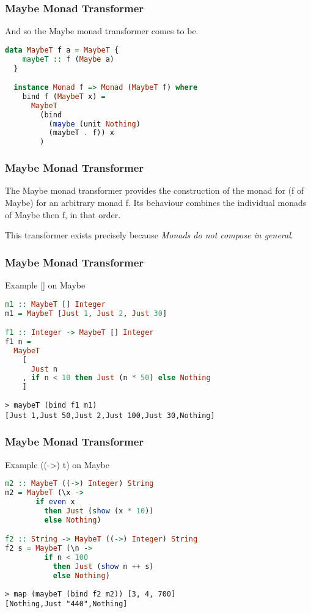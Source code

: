 \begin{frame}[fragile]
\frametitle{Maybe Monad Transformer}
And so the Maybe monad transformer comes to be.

\begin{lstlisting}[language=haskell]
  data MaybeT f a = MaybeT { 
    maybeT :: f (Maybe a)
  }

  instance Monad f => Monad (MaybeT f) where
    bind f (MaybeT x) =
      MaybeT 
        (bind 
          (maybe (unit Nothing) 
          (maybeT . f)) x
        )
\end{lstlisting}
\end{frame}

\begin{frame}[fragile]
\frametitle{Maybe Monad Transformer}
\begin{block}{The Maybe monad transformer}
provides the construction of the monad for (f of Maybe) for an arbitrary monad f. Its behaviour combines the individual monads of Maybe then f, in that order.
\end{block}
\begin{block}{This transformer exists}
precisely because \emph{Monads do not compose in general}.
\end{block}
\end{frame}

\begin{frame}[fragile]
\frametitle{Maybe Monad Transformer}
\begin{block}{Example [] on Maybe}
\begin{lstlisting}[language=haskell]
m1 :: MaybeT [] Integer
m1 = MaybeT [Just 1, Just 2, Just 30]

f1 :: Integer -> MaybeT [] Integer
f1 n =
  MaybeT
    [
      Just n
    , if n < 10 then Just (n * 50) else Nothing
    ]
\end{lstlisting}
\end{block}
\begin{lstlisting}
> maybeT (bind f1 m1)
[Just 1,Just 50,Just 2,Just 100,Just 30,Nothing]
\end{lstlisting}
\end{frame}

\begin{frame}[fragile]
\frametitle{Maybe Monad Transformer}
\begin{block}{Example ((->) t) on Maybe}
\begin{lstlisting}[language=haskell]
m2 :: MaybeT ((->) Integer) String
m2 = MaybeT (\x ->
       if even x
         then Just (show (x * 10))
         else Nothing)

f2 :: String -> MaybeT ((->) Integer) String
f2 s = MaybeT (\n -> 
         if n < 100
           then Just (show n ++ s)
           else Nothing)
\end{lstlisting}
\end{block}
\begin{lstlisting}
> map (maybeT (bind f2 m2)) [3, 4, 700]
[Nothing,Just "440",Nothing]
\end{lstlisting}
\end{frame}

